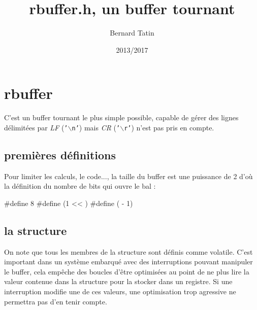\documentclass[10pt]{article}%
\author{Bernard Tatin}
\date{2013/2017}
\title{rbuffer.h, un buffer tournant}
\begin{document}
\pagestyle{noweb}
\maketitle
\tableofcontents
\section{rbuffer}

C'est un buffer tournant le plus simple possible, capable de gérer des lignes délimitées par \emph{LF} (\texttt{'$\backslash$n'}) mais \emph{CR} (\texttt{'$\backslash$r'}) n'est pas pris en compte.

\subsection{premières définitions}
Pour limiter les calculs, le code..., la taille du buffer est une puissance de 2 d'où la définition du nombre de bits qui ouvre le bal :

\endmoddef\nwstartdeflinemarkup{}\nwenddeflinemarkup
#define    8
#define     (1 << )
#define     ( - 1)
\eatline
{}\nwendcode{}\nwdocspar
\nwenddocs{}\nwdocspar
\subsection{la structure}

On note que tous les membres de la structure sont définis comme {\Tt{}volatile\nwendquote}. C'est important dans un système embarqué avec des interruptions pouvant manipuler le buffer, cela empêche des boucles d'être optimisées au point de ne plus lire la valeur contenue dans la structure pour la stocker dans un registre. Si une interruption modifie une de ces valeurs, une optimisation trop agressive ne permettra pas d'en tenir compte.
\end{document}
